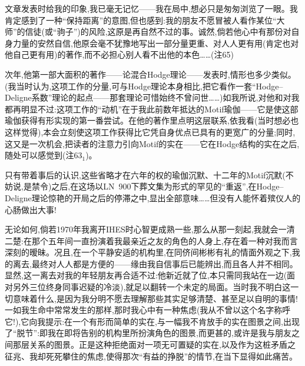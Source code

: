 文章发表时给我的印象,我已毫无记忆——我在局中,想必只是匆匆浏览了一眼。我肯定感到了一种“保持距离”的意图,但也感到:我的朋友不愿冒被人看作某位“大师”的信徒(或“驹子”)的风险,这原是再自然不过的事。诚然,倘若他心中有那份对自身力量的安然自信\dmark{},他原会毫不犹豫地写出一部分量更重、对人人更有用(肯定也对他自己更有用)的著作,而不必担心别人看不出他的本色……(注65)

次年,他第一部大面积的著作——论混合Hodge理论——发表时,情形也多少类似。(我当时认为,这项工作的分量,可与Hodge理论本身相比,把它看作一套“Hodge--Deligne系数”理论的起点——那套理论可惜始终不曾问世……)如我所说,对他和对我都再明显不过:这项工作的“动机”在于我此前数年抵达的Motif瑜伽——它是使这部瑜伽获得有形实现的第一番尝试。在他的著作里点明这层联系,依我看(当时想必也这样觉得),本会立刻使这项工作获得比它凭自身优点已具有的更宽广的分量;同时,这又是一次机会,把读者的注意力引向Motif的实在——它在Hodge结构的实在之后,随处可以感觉到(注63$_{1}$)。

只有带着事后的认识,这些省略才在六年的权的瑜伽沉默、十二年的Motif沉默(不妨说,是禁令)之后,在这场以LN~900下葬文集为形式的罕见的“重返”,在Hodge--Deligne理论惊艳的开局之后的停滞之中,显出全部意味……但没有人能怀着殡仪人的心肠做出大事!

无论如何,倘若1970年我离开IHES时心智更成熟一些,那么从那一刻起,我就会一清二楚:在那个五年间一直扮演着我最亲近之友的角色的人身上,存在着一种对我而言深刻的暧昧。况且,在一个平静安适的机构里,在同侪间彬彬有礼的情面外观之下,我的离去,最终对人人都是方便的——缘由我自信事后已能辨出,而且各人并不相同。\dmark{}显然,这一离去对我的年轻朋友再合适不过:他新近就了位,本只需同我站在一边(面对另外三位终身同事迟疑的冷淡),就足以翻转一个未定的局面。当时我不明白这一切意味着什么,是因为我分明不愿去理解那些其实足够清楚、甚至足以自明的事情!一如我生命中常常发生的那样,那时我心中有一种焦虑(我从不曾以这个名字称呼它!),它向我提示:在一个有形而简单的实在,与一幅我不肯放手的实在图景之间,出现了“脱节”:即我在即将告别的机构里所扮演角色的图景,而更甚的,或许是我与朋友之间那层关系的图景。正是这种拒绝面对一项无可置疑的实在,以及作为这桩矛盾之征兆、我却死死攀住的焦虑,使得那次“有益的挣脱”的情节,在当下显得如此痛苦。

